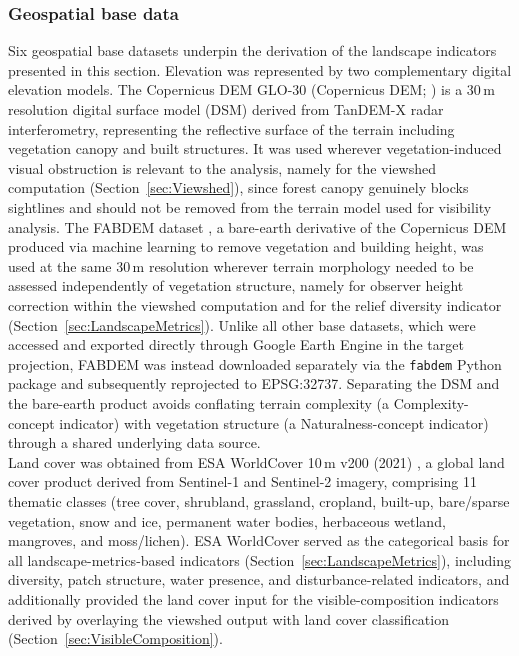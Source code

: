 \documentclass[hidelinks, 11pt]{article}
\begin{document}
\subsubsection{Geospatial base data}
Six geospatial base datasets underpin the derivation of the landscape indicators presented in this section. Elevation was represented by two complementary digital elevation models. The Copernicus DEM GLO-30 (Copernicus DEM; \citep{esa_copernicus_2024}) is a 30\,m resolution digital surface model (DSM) derived from TanDEM-X radar interferometry, representing the reflective surface of the terrain including vegetation canopy and built structures. It was used wherever vegetation-induced visual obstruction is relevant to the analysis, namely for the viewshed computation (Section~\ref{sec:Viewshed}), since forest canopy genuinely blocks sightlines and should not be removed from the terrain model used for visibility analysis. The FABDEM dataset \citep{hawker_fabdem_2022}, a bare-earth derivative of the Copernicus DEM produced via machine learning to remove vegetation and building height, was used at the same 30\,m resolution wherever terrain morphology needed to be assessed independently of vegetation structure, namely for observer height correction within the viewshed computation and for the relief diversity indicator (Section~\ref{sec:LandscapeMetrics}). Unlike all other base datasets, which were accessed and exported directly through Google Earth Engine \citep{gorelick_google_2017} in the target projection, FABDEM was instead downloaded separately via the \texttt{fabdem} Python package and subsequently reprojected to EPSG:32737. Separating the DSM and the bare-earth product avoids conflating terrain complexity (a Complexity-concept indicator) with vegetation structure (a Naturalness-concept indicator) through a shared underlying data source.
\\
Land cover was obtained from ESA WorldCover 10\,m v200 (2021) \citep{zanaga_esa_2022}, a global land cover product derived from Sentinel-1 and Sentinel-2 imagery, comprising 11 thematic classes (tree cover, shrubland, grassland, cropland, built-up, bare/sparse vegetation, snow and ice, permanent water bodies, herbaceous wetland, mangroves, and moss/lichen). ESA WorldCover served as the categorical basis for all landscape-metrics-based indicators (Section~\ref{sec:LandscapeMetrics}), including diversity, patch structure, water presence, and disturbance-related indicators, and additionally provided the land cover input for the visible-composition indicators derived by overlaying the viewshed output with land cover classification (Section~\ref{sec:VisibleComposition}).
\end{document}
